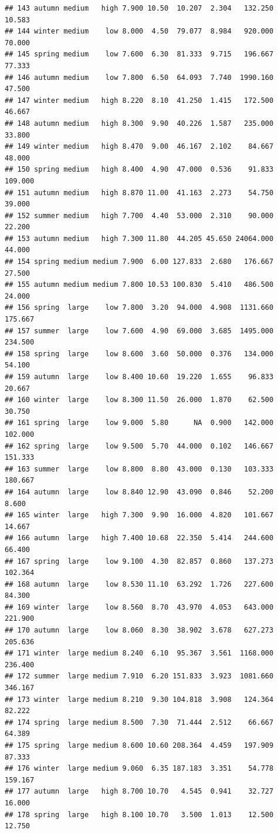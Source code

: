 \documentclass[]{report}
\begin{document}
\begin{verbatim}
## 143 autumn medium   high 7.900 10.50  10.207  2.304   132.250  10.583
## 144 winter medium    low 8.000  4.50  79.077  8.984   920.000  70.000
## 145 spring medium    low 7.600  6.30  81.333  9.715   196.667  77.333
## 146 autumn medium    low 7.800  6.50  64.093  7.740  1990.160  47.500
## 147 winter medium   high 8.220  8.10  41.250  1.415   172.500  46.667
## 148 autumn medium   high 8.300  9.90  40.226  1.587   235.000  33.800
## 149 winter medium   high 8.470  9.00  46.167  2.102    84.667  48.000
## 150 spring medium   high 8.400  4.90  47.000  0.536    91.833 109.000
## 151 autumn medium   high 8.870 11.00  41.163  2.273    54.750  39.000
## 152 summer medium   high 7.700  4.40  53.000  2.310    90.000  22.200
## 153 autumn medium   high 7.300 11.80  44.205 45.650 24064.000  44.000
## 154 spring medium medium 7.900  6.00 127.833  2.680   176.667  27.500
## 155 autumn medium medium 7.800 10.53 100.830  5.410   486.500  24.000
## 156 spring  large    low 7.800  3.20  94.000  4.908  1131.660 175.667
## 157 summer  large    low 7.600  4.90  69.000  3.685  1495.000 234.500
## 158 spring  large    low 8.600  3.60  50.000  0.376   134.000  54.100
## 159 autumn  large    low 8.400 10.60  19.220  1.655    96.833  20.667
## 160 winter  large    low 8.300 11.50  26.000  1.870    62.500  30.750
## 161 spring  large    low 9.000  5.80      NA  0.900   142.000 102.000
## 162 spring  large    low 9.500  5.70  44.000  0.102   146.667 151.333
## 163 summer  large    low 8.800  8.80  43.000  0.130   103.333 180.667
## 164 autumn  large    low 8.840 12.90  43.090  0.846    52.200   8.600
## 165 winter  large   high 7.300  9.90  16.000  4.820   101.667  14.667
## 166 autumn  large   high 7.400 10.68  22.350  5.414   244.600  66.400
## 167 spring  large    low 9.100  4.30  82.857  0.860   137.273 102.364
## 168 autumn  large    low 8.530 11.10  63.292  1.726   227.600  84.300
## 169 winter  large    low 8.560  8.70  43.970  4.053   643.000 221.900
## 170 autumn  large    low 8.060  8.30  38.902  3.678   627.273 205.636
## 171 winter  large medium 8.240  6.10  95.367  3.561  1168.000 236.400
## 172 summer  large medium 7.910  6.20 151.833  3.923  1081.660 346.167
## 173 winter  large medium 8.210  9.30 104.818  3.908   124.364  82.222
## 174 spring  large medium 8.500  7.30  71.444  2.512    66.667  64.389
## 175 spring  large medium 8.600 10.60 208.364  4.459   197.909  87.333
## 176 winter  large medium 9.060  6.35 187.183  3.351    54.778 159.167
## 177 autumn  large   high 8.700 10.70   4.545  0.941    32.727  16.000
## 178 spring  large   high 8.100 10.70   3.500  1.013    12.500  12.750

\end{verbatim}
\end{document}
